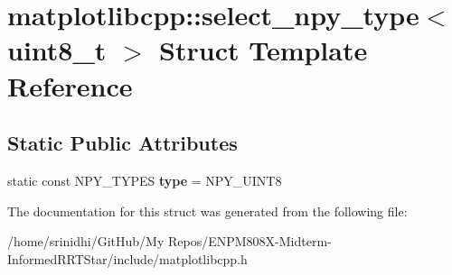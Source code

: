 \hypertarget{structmatplotlibcpp_1_1select__npy__type_3_01uint8__t_01_4}{}\section{matplotlibcpp\+:\+:select\+\_\+npy\+\_\+type$<$ uint8\+\_\+t $>$ Struct Template Reference}
\label{structmatplotlibcpp_1_1select__npy__type_3_01uint8__t_01_4}
\subsection*{Static Public Attributes}
\begin{DoxyCompactItemize}
\item 
static const N\+P\+Y\+\_\+\+T\+Y\+P\+ES {\bfseries type} = N\+P\+Y\+\_\+\+U\+I\+N\+T8\hypertarget{structmatplotlibcpp_1_1select__npy__type_3_01uint8__t_01_4_a6e80bfd252a69f14ff869c8b4fbb9e54}{}\label{structmatplotlibcpp_1_1select__npy__type_3_01uint8__t_01_4_a6e80bfd252a69f14ff869c8b4fbb9e54}

\end{DoxyCompactItemize}


The documentation for this struct was generated from the following file\+:\begin{DoxyCompactItemize}
\item 
/home/srinidhi/\+Git\+Hub/\+My Repos/\+E\+N\+P\+M808\+X-\/\+Midterm-\/\+Informed\+R\+R\+T\+Star/include/matplotlibcpp.\+h\end{DoxyCompactItemize}
